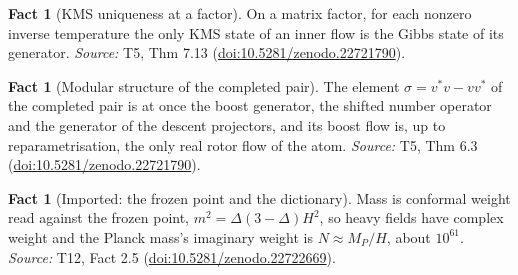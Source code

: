 \documentclass[11pt]{article}
\theoremstyle{definition}
\newtheorem{fact}[theorem]{Fact}
\theoremstyle{plain}
\begin{document}
\begin{fact}[KMS uniqueness at a factor]\label{c:singularity.kms-uniqueness-factor}
On a matrix factor, for each nonzero inverse temperature the only KMS state of an inner flow is the Gibbs state of its generator.
\emph{Source:} T5, Thm 7.13 (\href{https://doi.org/10.5281/zenodo.22721790}{doi:10.5281/zenodo.22721790}).
\end{fact}

\begin{fact}[Modular structure of the completed pair]\label{c:singularity.modular-structure-completed-pair}
The element $\sigma = v^*v - vv^*$ of the completed pair is at once the boost generator, the shifted number operator and the generator of the descent projectors, and its boost flow is, up to reparametrisation, the only real rotor flow of the atom.
\emph{Source:} T5, Thm 6.3 (\href{https://doi.org/10.5281/zenodo.22721790}{doi:10.5281/zenodo.22721790}).
\end{fact}

\begin{fact}[Imported: the frozen point and the dictionary]\label{c:standard-model.imported-frozen-point-dictionary}
Mass is conformal weight read against the frozen point, $m^{2} = \Delta(3-\Delta)H^{2}$, so heavy fields have complex weight and the Planck mass's imaginary weight is $N \approx M_{P}/H$, about $10^{61}$.
\emph{Source:} T12, Fact 2.5 (\href{https://doi.org/10.5281/zenodo.22722669}{doi:10.5281/zenodo.22722669}).
\end{fact}
\end{document}
